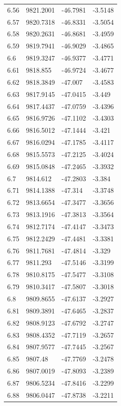 \begin{table}[H]
\begin{tabular}{llll}
6.56 & 9821.2001 & -46.7981 & -3.5148 \\
6.57 & 9820.7318 & -46.8331 & -3.5054 \\
6.58 & 9820.2631 & -46.8681 & -3.4959 \\
6.59 & 9819.7941 & -46.9029 & -3.4865 \\
6.6 & 9819.3247 & -46.9377 & -3.4771 \\
6.61 & 9818.855 & -46.9724 & -3.4677 \\
6.62 & 9818.3849 & -47.007 & -3.4583 \\
6.63 & 9817.9145 & -47.0415 & -3.449 \\
6.64 & 9817.4437 & -47.0759 & -3.4396 \\
6.65 & 9816.9726 & -47.1102 & -3.4303 \\
6.66 & 9816.5012 & -47.1444 & -3.421 \\
6.67 & 9816.0294 & -47.1785 & -3.4117 \\
6.68 & 9815.5573 & -47.2125 & -3.4024 \\
6.69 & 9815.0848 & -47.2465 & -3.3932 \\
6.7 & 9814.612 & -47.2803 & -3.384 \\
6.71 & 9814.1388 & -47.314 & -3.3748 \\
6.72 & 9813.6654 & -47.3477 & -3.3656 \\
6.73 & 9813.1916 & -47.3813 & -3.3564 \\
6.74 & 9812.7174 & -47.4147 & -3.3473 \\
6.75 & 9812.2429 & -47.4481 & -3.3381 \\
6.76 & 9811.7681 & -47.4814 & -3.329 \\
6.77 & 9811.293 & -47.5146 & -3.3199 \\
6.78 & 9810.8175 & -47.5477 & -3.3108 \\
6.79 & 9810.3417 & -47.5807 & -3.3018 \\
6.8 & 9809.8655 & -47.6137 & -3.2927 \\
6.81 & 9809.3891 & -47.6465 & -3.2837 \\
6.82 & 9808.9123 & -47.6792 & -3.2747 \\
6.83 & 9808.4352 & -47.7119 & -3.2657 \\
6.84 & 9807.9577 & -47.7445 & -3.2567 \\
6.85 & 9807.48 & -47.7769 & -3.2478 \\
6.86 & 9807.0019 & -47.8093 & -3.2389 \\
6.87 & 9806.5234 & -47.8416 & -3.2299 \\
6.88 & 9806.0447 & -47.8738 & -3.2211 \\

\end{tabular}
\end{table}
